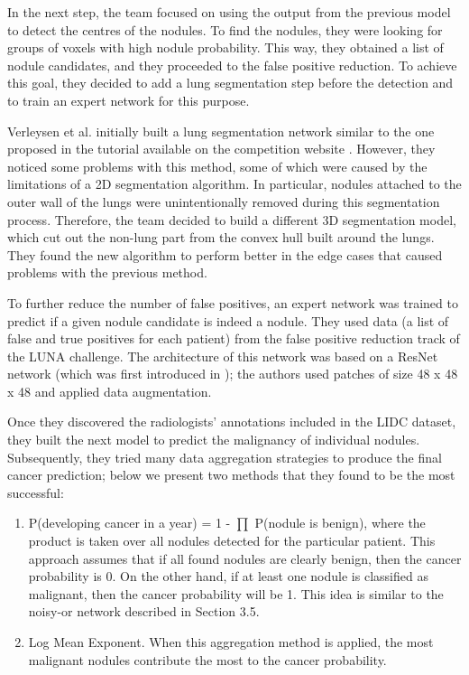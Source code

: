 \documentclass[12pt]{article}
\begin{document}
In the next step, the team focused on using the output from the previous model to detect the centres of the nodules. To find the nodules, they were looking for groups of voxels with high nodule probability. This way, they obtained a list of nodule candidates, and they proceeded to the false positive reduction. To achieve this goal, they decided to add a lung segmentation step before the detection and to train an expert network for this purpose.

Verleysen et al. initially built a lung segmentation network similar to the one proposed in the tutorial available on the competition website \citep{kaggle}. However, they noticed some problems with this method, some of which were caused by the limitations of a 2D segmentation algorithm. In particular, nodules attached to the outer wall of the lungs were unintentionally removed during this segmentation process. Therefore, the team decided to build a different 3D segmentation model, which cut out the non-lung part from the convex hull built around the lungs. They found the new algorithm to perform better in the edge cases that caused problems with the previous method.

To further reduce the number of false positives, an expert network was trained to predict if a given nodule candidate is indeed a nodule. They used data (a list of false and true positives for each patient) from the false positive reduction track of the LUNA challenge. The architecture of this network was based on a ResNet network (which was first introduced in \citep{he2016deep}); the authors used patches of size 48 x 48 x 48 and applied data augmentation. 

Once they discovered the radiologists' annotations included in the LIDC dataset, they built the next model to predict the malignancy of individual nodules. Subsequently, they tried many data aggregation strategies to produce the final cancer prediction; below we present two methods that they found to be the most successful:
\begin{enumerate}
\item P(developing cancer in a year) = 1 - $\prod$ P(nodule is benign), where the product is taken over all nodules detected for the particular patient. This approach assumes that if all found nodules are clearly benign, then the cancer probability is 0. On the other hand, if at least one nodule is classified as malignant, then the cancer probability will be 1. This idea is similar to the noisy-or network described in Section 3.5.
\item Log Mean Exponent. When this aggregation method is applied, the most malignant nodules contribute the most to the cancer probability.
\end{enumerate}
\end{document}
